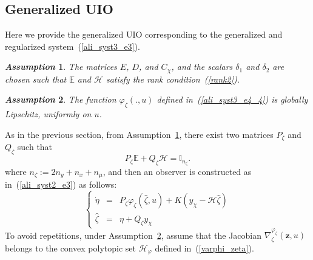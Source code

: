 \documentclass{ifacconf}
\def\eqref#1{(\ref{#1})}
\newtheorem{assumption}{\it \textbf{Assumption}}%
\begin{document}
{%




\subsection{Generalized UIO}\label{generalized_uio}
Here we provide the generalized UIO corresponding to the generalized and regularized system~\eqref{ali_syst3_e3}.

\begin{assumption}\label{ali_gen_hyp1}
The matrices $E$, $D$, and $C_{\chi}$, and the scalars $\delta_1$ and $\delta_2$ are chosen such that $\mathbb{E}$ and $\mathcal{H}$ satisfy the rank condition~\eqref{rank2}.
\end{assumption}

\begin{assumption}\label{ali_gen_hyp2}
The function $\varphi_{\zeta}(.,u)$ defined in~\eqref{ali_syst3_e4_4} is globally Lipschitz, uniformly on $u$.
\end{assumption}


As in the previous section, from Assumption~\ref{ali_gen_hyp1},  there exist two matrices $P_{\zeta}$ and $Q_{\zeta}$ such that
\begin{equation}\label{ali_syst3_e5'}
 P_{\zeta} \mathbb{E} + Q_{\zeta} \mathcal{H} = \mathbb{I}_{n_{\zeta}}.
\end{equation}
where $n_{\zeta} := 2n_{y} + n_{x} + n_{\mu}$, and then an observer is constructed as in~\eqref{ali_syst2_e3} as follows: 
\begin{equation}\label{ali_syst3_e5}
\left\{
\begin{array}{rcl}
\dot{\eta} & = & P_{\zeta} \varphi_{\zeta}(\hat{\zeta},u) + K \left( y_{\chi} - \mathcal{H} \hat{\zeta} \right)
\\
\hat{\zeta} & = & \eta + Q_{\zeta} y_{\chi} 
\end{array}
\right.
\end{equation}
To avoid repetitions, under Assumption~\ref{ali_gen_hyp2}, assume that the Jacobian $\nabla^{\varphi_{\zeta}}_{\zeta}(\bm{z},u)$ belongs to the convex polytopic set $\mathcal{H}_{\varphi} $ defined in~\eqref{varphi_zeta}.

}
\end{document}
